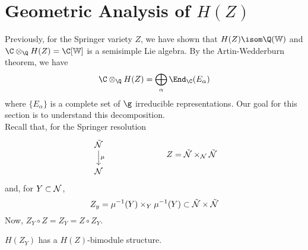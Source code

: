 \documentclass[springer-theory-notes.tex]{subfiles}
\begin{document}
\section{Geometric Analysis of \(H(Z)\)}
Previously, for the Springer variety \(Z\), we have shown that \(H(Z) \isom \Q(\W)\) and \(\C
\otimes_\Q H(Z) = \C[\W]\) is a semisimple Lie algebra. By the
Artin-Wedderburn theorem, we have \[
  \C \otimes_\Q H(Z) = \bigoplus_\alpha \End_\C(E_\alpha)
\]
where \(\{E_\alpha\}\) is a complete set of \(\g\) irreducible
representations. Our goal for this section is to understand this
decomposition. \\

Recall that, for the Springer resolution \[
  \begin{tikzcd}
    \tilde{\cN} \ar[d, "\mu"] \\
    \cN
  \end{tikzcd} \hspace{1in} Z = \tilde{\cN} \times_\cN \tilde{\cN}
\]
and, for \(Y \subset \mathcal{N}\), \[
  Z_y = \mu^{-1}(Y) \times_Y \mu^{-1}(Y) \subset \tilde{\mathcal{N}} \times \tilde{\mathcal{N}}
\]
Now, \(Z_Y \circ Z = Z_Y = Z \circ Z_Y\).
\begin{prop}
  \(H(Z_Y)\) has a \(H(Z)\)-bimodule structure.
\end{prop}
\end{document}
